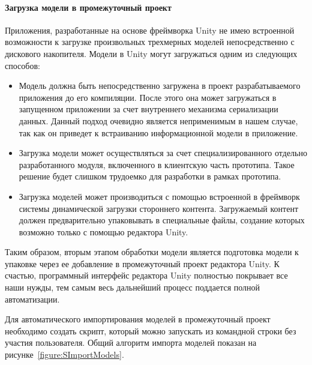 ﻿\paragraph{Загрузка модели в промежуточный проект}

Приложения, разработанные на основе фреймворка Unity не имею встроенной возможности
к загрузке произвольных трехмерных моделей непосредственно с дискового накопителя.
Модели в Unity могут загружаться одним из следующих способов:

\begin{itemize}
    \item {
        Модель должна быть непосредственно загружена в проект
        разрабатываемого приложения до его компиляции.
        После этого она может загружаться в запущенном приложении
        за счет внутреннего механизма сериализации данных.
        Данный подход очевидно является неприменимым в нашем случае,
        так как он приведет к встраиванию информационной модели в приложение. 
    }
    \item {
        Загрузка модели может осуществляться за счет
        специализированного отдельно разработанного модуля,
        включенного в клиентскую часть прототипа.
        Такое решение будет слишком трудоемко для разработки в рамках прототипа. 
    }
    \item {
        Загрузка моделей может производиться с помощью встроенной в фреймворк
        системы динамической загрузки стороннего контента.
        Загружаемый контент должен предварительно упаковывать
        в специальные файлы, создание которых возможно только
        с помощью редактора Unity.
    }
\end{itemize}

Таким образом, вторым этапом обработки модели является подготовка модели к упаковке
через ее добавление в промежуточный проект редактора Unity.
К счастью, программный интерфейс редактора Unity полностью покрывает
все наши нужды, тем самым весь дальнейший процесс поддается полной автоматизации.

Для автоматического импортирования моделей в промежуточный проект
необходимо создать скрипт, который можно запускать из командной строки
без участия пользователя.\cite{DocUnity}
Общий алгоритм импорта моделей показан на рисунке~\ref{figure:SImportModels}.

